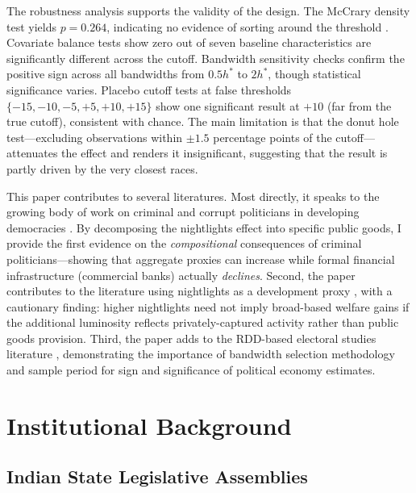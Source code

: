 \documentclass[12pt]{article}
\begin{document}
The robustness analysis supports the validity of the design. The McCrary density test yields $p=0.264$, indicating no evidence of sorting around the threshold \citep{mccrary2008}. Covariate balance tests show zero out of seven baseline characteristics are significantly different across the cutoff. Bandwidth sensitivity checks confirm the positive sign across all bandwidths from $0.5h^*$ to $2h^*$, though statistical significance varies. Placebo cutoff tests at false thresholds $\{-15, -10, -5, +5, +10, +15\}$ show one significant result at $+10$ (far from the true cutoff), consistent with chance. The main limitation is that the donut hole test---excluding observations within $\pm 1.5$ percentage points of the cutoff---attenuates the effect and renders it insignificant, suggesting that the result is partly driven by the very closest races.

This paper contributes to several literatures. Most directly, it speaks to the growing body of work on criminal and corrupt politicians in developing democracies \citep{aidt2011,chemin2012,dutta2012,george2020,vaishnav2017,fisman2014}. By decomposing the nightlights effect into specific public goods, I provide the first evidence on the \textit{compositional} consequences of criminal politicians---showing that aggregate proxies can increase while formal financial infrastructure (commercial banks) actually \textit{declines}. Second, the paper contributes to the literature using nightlights as a development proxy \citep{henderson2012,hodler2014,storeygard2016,asher2017}, with a cautionary finding: higher nightlights need not imply broad-based welfare gains if the additional luminosity reflects privately-captured activity rather than public goods provision. Third, the paper adds to the RDD-based electoral studies literature \citep{lee2008,LeeLemieux2010,imbens2008,cattaneo2022}, demonstrating the importance of bandwidth selection methodology and sample period for sign and significance of political economy estimates.



\section{Institutional Background}

\subsection{Indian State Legislative Assemblies}
\end{document}

